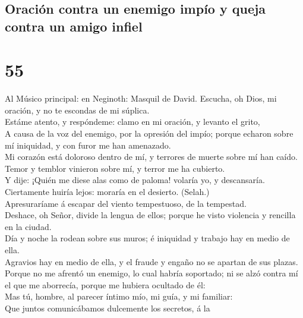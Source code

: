 \hypertarget{oraciuxf3n-contra-un-enemigo-impuxedo-y-queja-contra-un-amigo-infiel}{%
\subsection{Oración contra un enemigo impío y queja contra un amigo
infiel}\label{oraciuxf3n-contra-un-enemigo-impuxedo-y-queja-contra-un-amigo-infiel}}

\hypertarget{section-54}{%
\section{55}\label{section-54}}

 Al Músico principal: en Neginoth: Masquil de David.
Escucha, oh Dios, mi oración, y no te escondas de mi súplica.\\
 Estáme atento, y respóndeme: clamo en mi oración, y
levanto el grito,\\
 A causa de la voz del enemigo, por la opresión del impío;
porque echaron sobre mí iniquidad, y con furor me han amenazado.\\
 Mi corazón está doloroso dentro de mí, y terrores de
muerte sobre mí han caído.\\
 Temor y temblor vinieron sobre mí, y terror me ha
cubierto.\\
 Y dije: ¡Quién me diese alas como de paloma! volaría yo,
y descansaría.\\
 Ciertamente huiría lejos: moraría en el desierto.
(Selah.)\\
 Apresuraríame á escapar del viento tempestuoso, de la
tempestad.\\
 Deshace, oh Señor, divide la lengua de ellos; porque he
visto violencia y rencilla en la ciudad.\\
 Día y noche la rodean sobre sus muros; é iniquidad y
trabajo hay en medio de ella.\\
 Agravios hay en medio de ella, y el fraude y engaño no
se apartan de sus plazas.\\
 Porque no me afrentó un enemigo, lo cual habría
soportado; ni se alzó contra mí el que me aborrecía, porque me hubiera
ocultado de él:\\
 Mas tú, hombre, al parecer íntimo mío, mi guía, y mi
familiar:\\
 Que juntos comunicábamos dulcemente los secretos, á la
